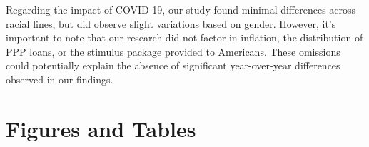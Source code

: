 \documentclass[12pt,english]{article}
\begin{document}
Regarding the impact of COVID-19, our study found minimal differences across racial lines, but did observe slight variations based on gender. However, it's important to note that our research did not factor in inflation, the distribution of PPP loans, or the stimulus package provided to Americans. These omissions could potentially explain the absence of significant year-over-year differences observed in our findings.

\vfill
\pagebreak{}
\begin{spacing}{1.0}


\end{spacing}

\vfill
\pagebreak{}
\clearpage

\section{Figures and Tables}\label{sec:figTables}
\end{document}
